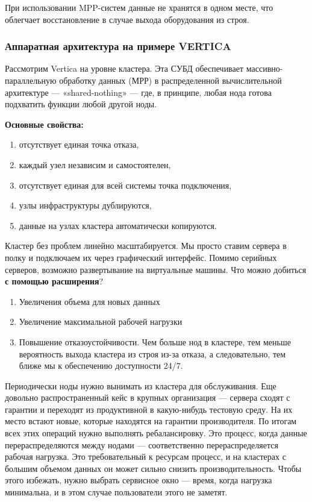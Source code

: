 При использовании MPP-систем данные не хранятся в одном месте, что
облегчает
восстановление в случае выхода оборудования из строя.

\subsubsection{Аппаратная архитектура на примере VERTICA}

Рассмотрим Vertica на уровне кластера. Эта СУБД обеспечивает массивно-
параллельную
обработку данных (МРР) в распределенной вычислительной архитектуре —
«shared-nothing» — где, в принципе, любая нода готова подхватить функции
любой другой ноды. 

\textbf{Основные свойства:}

\begin{enumerate}
	\item отсутствует единая точка отказа,
		\item каждый узел независим и самостоятелен,
			\item отсутствует единая для всей системы точка подключения,
				\item узлы инфраструктуры дублируются,
		\item данные на узлах кластера автоматически копируются.
\end{enumerate}

Кластер без проблем линейно масштабируется. Мы просто ставим сервера
в полку и
подключаем их через графический интерфейс. Помимо серийных серверов,
возможно развертывание на виртуальные машины. Что можно добиться \textbf{с помощью
расширения}?

\begin{enumerate}
	\item Увеличения объема для новых данных
	\item Увеличение максимальной рабочей нагрузки
	\item Повышение отказоустойчивости. Чем больше нод в кластере, тем меньше
	вероятность
	выхода кластера из строя из-за отказа, а следовательно, тем ближе мы к
	обеспечению
	доступности 24/7.
\end{enumerate}

Периодически ноды нужно вынимать из кластера для обслуживания. Еще
довольно
распространенный кейс в крупных организация — сервера сходят с
гарантии и переходят из продуктивной в какую-нибудь тестовую среду. На
их место встают новые, которые находятся на гарантии производителя. По
итогам всех этих операций нужно выполнять ребалансировку.
Это процесс, когда данные перераспределяются между нодами —
соответственно
перераспределяется рабочая нагрузка. Это требовательный к ресурсам
процесс, и на
кластерах с большим объемом данных он может сильно снизить
производительность. Чтобы этого избежать, нужно выбрать сервисное окно
— время, когда нагрузка минимальна, и в этом случае пользователи этого
не заметят.

